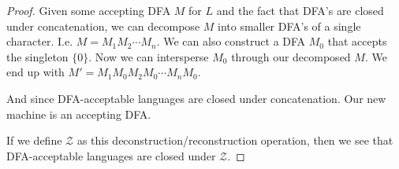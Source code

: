\documentclass[12pt,letterpaper]{article}
\begin{document}
\begin{enumerate}
\begin{proof}
        Given some accepting DFA $M$ for $L$ and the fact that DFA's are closed under concatenation, we can decompose $M$ into smaller DFA's of a single character.
        I.e. $M = M_1M_2 \cdots M_n$.
        We can also construct a DFA $M_0$ that accepts the singleton $\{0\}$.
        Now we can intersperse $M_0$ through our decomposed $M$.
        We end up with $M' = M_1M_0M_2M_0 \cdots M_nM_0$.

        And since DFA-acceptable languages are closed under concatenation.
        Our new machine is an accepting DFA.

        If we define $\mathcal{Z}$ as this deconstruction/reconstruction operation,
        then we see that DFA-acceptable languages are closed under $\mathcal{Z}$.
      \end{proof}
  \end{enumerate}
\end{document}
